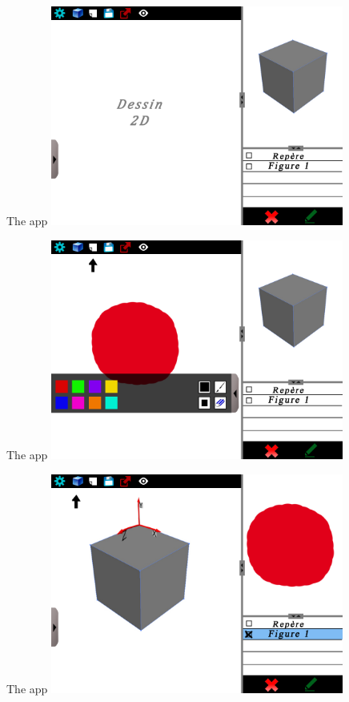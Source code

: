 \documentclass[a4paper,10pt]{beamer}
\begin{document}
			\begin{frame}{The app}
				\includegraphics[height=205pt]{maquette/maquette_2.png}
			\end{frame}
			
			\begin{frame}{The app}
				\includegraphics[height=205pt]{maquette/maquette_3.png}
			\end{frame}
			
			\begin{frame}{The app}
				\includegraphics[height=205pt]{maquette/maquette_4.png}
			\end{frame}
			
\end{document}
